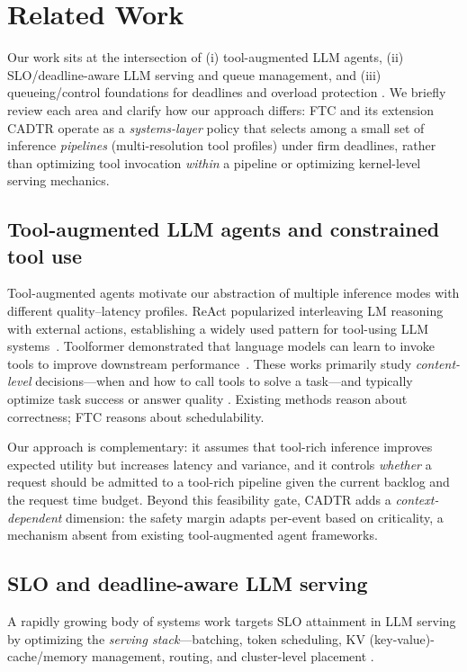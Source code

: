 \documentclass[preprint,12pt]{elsarticle}
\begin{document}
\section{Related Work}
\label{sec:related_work}

Our work sits at the intersection of (i) tool-augmented LLM agents, (ii) SLO/deadline-aware LLM serving and queue management, and (iii) queueing/control foundations for deadlines and overload protection \cite{nie2024aladdin}. We briefly review each area and clarify how our approach differs: FTC and its extension CADTR operate as a \emph{systems-layer} policy that selects among a small set of inference \emph{pipelines} (multi-resolution tool profiles) under firm deadlines, rather than optimizing tool invocation \emph{within} a pipeline or optimizing kernel-level serving mechanics.

\subsection{Tool-augmented LLM agents and constrained tool use}
Tool-augmented agents motivate our abstraction of multiple inference modes with different quality--latency profiles. ReAct popularized interleaving LM reasoning with external actions, establishing a widely used pattern for tool-using LLM systems~\cite{yao2023react}. Toolformer demonstrated that language models can learn to invoke tools to improve downstream performance~\cite{schick2023toolformer}. These works primarily study \emph{content-level} decisions---when and how to call tools to solve a task---and typically optimize task success or answer quality \cite{pars2025, 258862}. Existing methods reason about correctness; FTC reasons about schedulability.

Our approach is complementary: it assumes that tool-rich inference improves expected utility but increases latency and variance, and it controls \emph{whether} a request should be admitted to a tool-rich pipeline given the current backlog and the request time budget. Beyond this feasibility gate, CADTR adds a \emph{context-dependent} dimension: the safety margin adapts per-event based on criticality, a mechanism absent from existing tool-augmented agent frameworks.

\subsection{SLO and deadline-aware LLM serving}
A rapidly growing body of systems work targets SLO attainment in LLM serving by optimizing the \emph{serving stack}---batching, token scheduling, KV (key-value)-cache/memory management, routing, and cluster-level placement \cite{agentxpu2025}.
\end{document}
